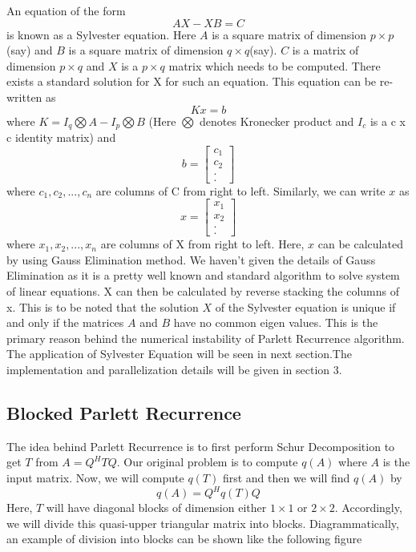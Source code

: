 \documentclass[12pt,a4paper]{article}
\begin{document}
An equation of the form $$AX - XB = C$$ is known as a Sylvester equation. Here $A$ is a square matrix of dimension $p \times p$(say) and $B$ is a square matrix of dimension $q \times q$(say). $C$ is a matrix of dimension $p \times q$ and $X$ is a $p \times q$ matrix which needs to be computed. There exists a standard solution for X for such an equation. This equation can be re-written as $$Kx=b$$ where $K=I_q\bigotimes A- I_p\bigotimes B$ (Here $\bigotimes$ denotes Kronecker product and $I_c$ is a c x c identity matrix) and $$b=\begin{bmatrix}c_1 \\ c_2 \\ . \\ . \end{bmatrix}$$ 
where $c_1,c_2,...,c_n$ are columns of C from right to left. Similarly, we can write $x$ as
$$x=\begin{bmatrix}x_1 \\ x_2 \\ . \\ . \end{bmatrix}$$
where $x_1, x_2, ..., x_n$ are columns of X from right to left. Here, $x$ can be calculated by using Gauss Elimination method. We haven't given the details of Gauss Elimination as it is a pretty well known and standard algorithm to solve system of linear equations. X can then be calculated by reverse stacking the columns of x. 
This is to be noted that the solution $X$ of the Sylvester equation is unique if and only if the matrices $A$ and $B$ have no common eigen values. This is the primary reason behind the numerical instability of Parlett Recurrence algorithm. The application of Sylvester Equation will be seen in next section.The implementation and parallelization details will be given in section 3.

\subsection{Blocked Parlett Recurrence}
The idea behind Parlett Recurrence is to first perform Schur Decomposition to get $T$ from $A = Q^{H}TQ$. Our original problem is to compute $q(A)$ where $A$  is the input matrix. Now, we will compute $q(T)$ first and then we will find $q(A)$ by
$$q(A) = Q^{H}q(T)Q$$
Here, $T$ will have diagonal blocks of dimension either $1 \times 1$ or $2 \times 2$. Accordingly, we will divide this quasi-upper triangular matrix into blocks. Diagrammatically, an example of division into blocks can be shown like the following figure
\end{document}

